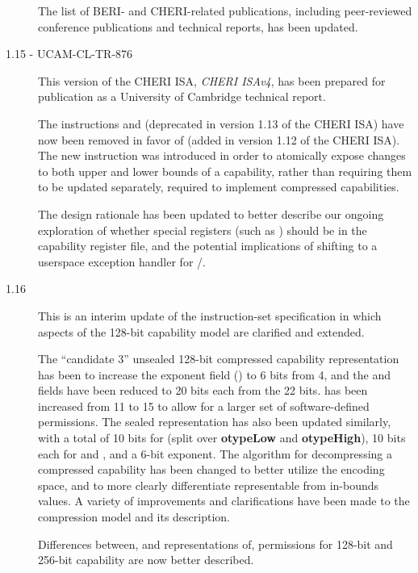 \begin{description}
  The list of BERI- and CHERI-related publications, including peer-reviewed
  conference publications and technical reports, has been updated.

\item[1.15 - UCAM-CL-TR-876]
  This version of the CHERI ISA, \textit{CHERI ISAv4}, has been prepared for
  publication as a University of Cambridge technical report.

  The instructions  and 
  (deprecated in version 1.13 of the CHERI ISA) have now been removed in favor
  of  (added in version 1.12 of the CHERI ISA).
  The new instruction was introduced in order to atomically expose changes to
  both upper and lower bounds of a capability, rather than requiring them to
  be updated separately, required to implement compressed capabilities.

  The design rationale has been updated to better describe our ongoing
  exploration of whether special registers (such as \KCC{}) should be in the
  capability register file, and the potential implications of shifting to a
  userspace exception handler for /.

\item[1.16] This is an interim update of the instruction-set specification in
  which aspects of the 128-bit capability model are clarified and extended.

  The ``candidate 3'' unsealed 128-bit compressed capability representation
  has been to increase the exponent field (\cexponent{}) to 6 bits from 4, and
  the \cbasebits{} and \ctopbits{} fields have been reduced to 20 bits each
  from the 22 bits.
  \cperms{} has been increased from 11 to 15 to allow for a larger set of
  software-defined permissions.
  The sealed representation has also been updated similarly, with a total of
  10 bits for \cotype{} (split over {\bf otypeLow} and {\bf otypeHigh}), 10
  bits each for \cbasebits{} and \ctopbits{}, and a 6-bit exponent.
  The algorithm for decompressing a compressed capability has been changed to
  better utilize the encoding space, and to more clearly differentiate
  representable from in-bounds values.
  A variety of improvements and clarifications have been made to the
  compression model and its description.

  Differences between, and representations of, permissions for 128-bit and
  256-bit capability are now better described.


\end{description}
